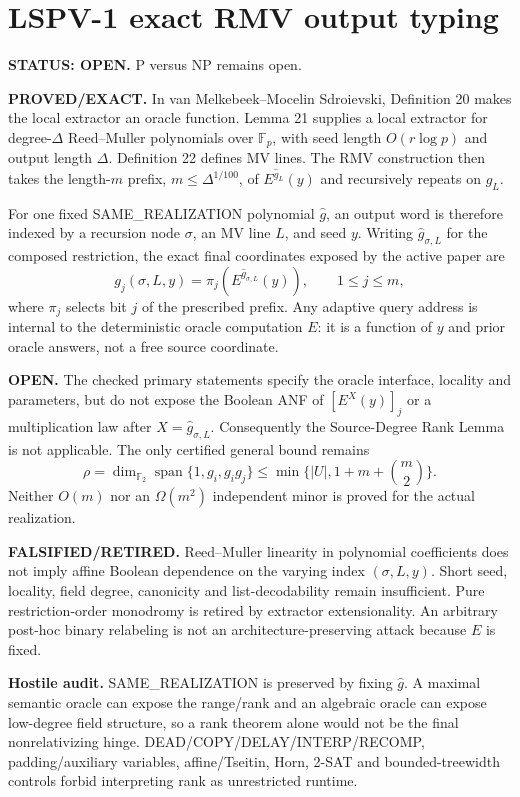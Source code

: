 \documentclass[11pt]{article}
\begin{document}
\section*{LSPV-1 exact RMV output typing}
\textbf{STATUS: OPEN.} P versus NP remains open.

\textbf{PROVED/EXACT.} In van Melkebeek--Mocelin Sdroievski, Definition 20 makes the local extractor an oracle function. Lemma 21 supplies a local extractor for degree-$\Delta$ Reed--Muller polynomials over $\mathbb F_p$, with seed length $O(r\log p)$ and output length $\Delta$. Definition 22 defines MV lines. The RMV construction then takes the length-$m$ prefix, $m\le\Delta^{1/100}$, of $E^{\widehat g_L}(y)$ and recursively repeats on $\widehat g_L$.

For one fixed SAME\_REALIZATION polynomial $\widehat g$, an output word is therefore indexed by a recursion node $\sigma$, an MV line $L$, and seed $y$. Writing $\widehat g_{\sigma,L}$ for the composed restriction, the exact final coordinates exposed by the active paper are
\[
g_j(\sigma,L,y)=\pi_j(E^{\widehat g_{\sigma,L}}(y)),\qquad 1\le j\le m,
\]
where $\pi_j$ selects bit $j$ of the prescribed prefix. Any adaptive query address is internal to the deterministic oracle computation $E$: it is a function of $y$ and prior oracle answers, not a free source coordinate.

\textbf{OPEN.} The checked primary statements specify the oracle interface, locality and parameters, but do not expose the Boolean ANF of $[E^X(y)]_j$ or a multiplication law after $X=\widehat g_{\sigma,L}$. Consequently the Source-Degree Rank Lemma is not applicable. The only certified general bound remains
\[
\rho=\dim_{\mathbb F_2}\operatorname{span}\{1,g_i,g_i g_j\}
\le \min\{|U|,1+m+\binom m2\}.
\]
Neither $O(m)$ nor an $\Omega(m^2)$ independent minor is proved for the actual realization.

\textbf{FALSIFIED/RETIRED.} Reed--Muller linearity in polynomial coefficients does not imply affine Boolean dependence on the varying index $(\sigma,L,y)$. Short seed, locality, field degree, canonicity and list-decodability remain insufficient. Pure restriction-order monodromy is retired by extractor extensionality. An arbitrary post-hoc binary relabeling is not an architecture-preserving attack because $E$ is fixed.

\textbf{Hostile audit.} SAME\_REALIZATION is preserved by fixing $\widehat g$. A maximal semantic oracle can expose the range/rank and an algebraic oracle can expose low-degree field structure, so a rank theorem alone would not be the final nonrelativizing hinge. DEAD/COPY/DELAY/INTERP/RECOMP, padding/auxiliary variables, affine/Tseitin, Horn, 2-SAT and bounded-treewidth controls forbid interpreting rank as unrestricted runtime.
\end{document}

